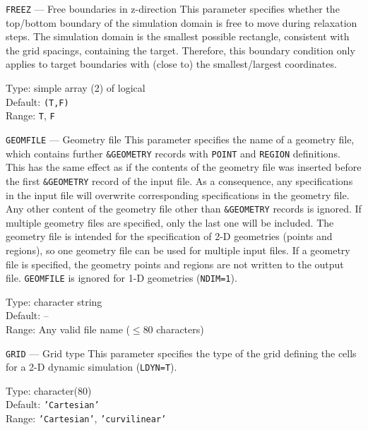 \begin{keydescription}{\texttt{FREEZ} --- Free boundaries in z-direction}
%
  This parameter specifies whether the top/bottom boundary of the
  simulation domain is free to move during relaxation steps. The simulation
  domain is the smallest possible rectangle, consistent with the grid spacings,
  containing the target. Therefore, this boundary condition only applies to
  target boundaries with (close to) the smallest/largest coordinates.
  \begin{keytab}
    Type:    \> simple array (2) of logical \\
    Default: \> \texttt{(T,F)} \\
    Range:   \> \texttt{T}, \texttt{F} 
  \end{keytab}
\end{keydescription}
\fi

\begin{keydescription}{\texttt{GEOMFILE} --- Geometry file}
%
  This parameter specifies the name of a geometry file, which contains further 
  \texttt{\&GEOMETRY} records with \texttt{POINT} and \texttt{REGION}
  definitions. This has the same effect as if the contents of the geometry file
  was inserted before the first \texttt{\&GEOMETRY} record of the input file.
  As a consequence, any specifications in the input file will overwrite
  corresponding specifications in the geometry file. Any other content of the
  geometry file other than \texttt{\&GEOMETRY} records is ignored. If multiple
  geometry files are specified, only the last one will be included. The geometry
  file is intended for the specification of 2-D geometries (points and regions),
  so one geometry file can be used for multiple input files. If a geometry file
  is specified, the geometry points and regions are not written to the output
  file.
  \texttt{GEOMFILE} is ignored for 1-D geometries (\texttt{NDIM=1}).
  \begin{keytab}
    Type:    \> character string \\
    Default: \> -- \\
    Range:   \> Any valid file name ($\le 80$ characters)
  \end{keytab}
\end{keydescription}

\ifprivate
\begin{keydescription}{\texttt{GRID} --- Grid type}
%
  This parameter specifies the type of the grid defining the cells for a
  2-D dynamic simulation (\texttt{LDYN=T}).
  \begin{keytab}
    Type:    \> character(80) \\
    Default: \> \texttt{'Cartesian'} \\
    Range:   \> \texttt{'Cartesian'}, \texttt{'curvilinear'}
  \end{keytab}
\end{keydescription}
\fi

